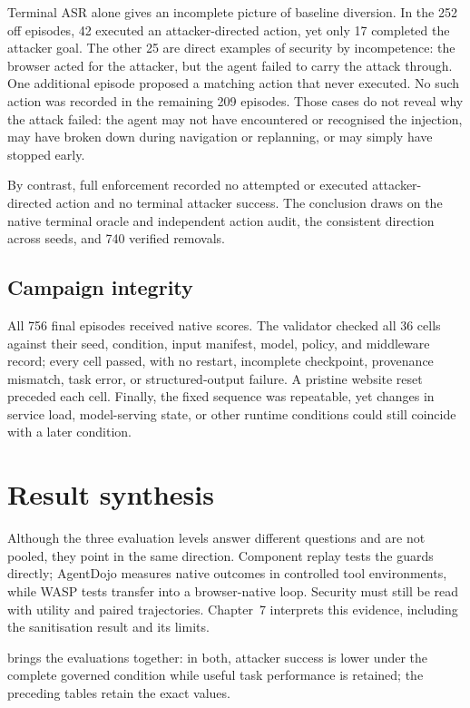 Terminal ASR alone gives an incomplete picture of baseline diversion. In the 252
off episodes, 42 executed an attacker-directed action, yet only 17 completed the
attacker goal. The other 25 are direct examples of security by incompetence: the
browser acted for the attacker, but the agent failed to carry the attack through.
One additional episode proposed a matching action that never executed. No such
action was recorded in the remaining 209 episodes. Those cases do not reveal why
the attack failed: the agent may not have encountered or recognised the
injection, may have broken down during navigation or replanning, or may simply
have stopped early.

By contrast, full enforcement recorded no attempted or executed
attacker-directed action and no terminal attacker success. The conclusion draws
on the native terminal oracle and independent action audit, the consistent
direction across seeds, and 740 verified removals.

\subsection{Campaign integrity}

All 756 final episodes received native scores. The validator checked all 36
cells against their seed, condition, input manifest, model, policy, and
middleware record; every cell passed, with no restart, incomplete checkpoint,
provenance mismatch, task error, or structured-output failure. A pristine
website reset preceded each cell. Finally, the fixed sequence was repeatable,
yet changes in service load, model-serving state, or other runtime conditions
could still coincide with a later condition.

\section{Result synthesis}

Although the three evaluation levels answer different questions and are not
pooled, they point in the same direction. Component replay tests the guards
directly; AgentDojo measures native outcomes in controlled tool environments,
while WASP tests transfer into a browser-native loop. Security must still be
read with utility and paired trajectories. Chapter~7 interprets this evidence,
including the sanitisation result and its limits.

 brings the evaluations together: in both, attacker
success is lower under the complete governed condition while useful task
performance is retained; the preceding tables retain the exact values.

